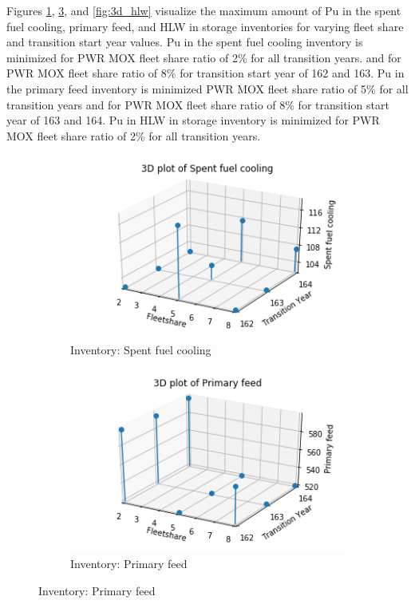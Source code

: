 Figures \ref{fig:3d_sfc}, \ref{fig:3d_pf}, and \ref{fig:3d_hlw}
visualize the maximum amount of Pu in the spent fuel cooling, 
primary feed, and \gls{HLW} in storage inventories for varying 
fleet share and transition start year values. 
Pu in the spent fuel cooling inventory is minimized for PWR MOX
fleet share ratio of 2\% for all transition years. 
and for PWR MOX fleet share ratio of 8\% for 
transition start year of 162 and 163.  
Pu in the primary feed inventory is minimized PWR MOX
fleet share ratio of 5\% for all transition years and for PWR MOX 
fleet share ratio of 8\% for 
transition start year of 163 and 164.                       
Pu in HLW in storage inventory is minimized for PWR MOX
fleet share ratio of 2\% for all transition years. 

\begin{figure}[H]
    \centering
    \begin{subfigure}[t]{\textwidth}
    \centering
        \includegraphics[width=0.4\linewidth]{figures/3d_sfc} 
        \caption{Inventory: Spent fuel cooling}
        \label{fig:3d_sfc}
    \end{subfigure}
    \begin{subfigure}[t]{0.4\textwidth}
        \centering
        \includegraphics[width=\linewidth]{figures/3d_pf} 
        \caption{Inventory: Primary feed}
	    \label{fig:3d_pf}

\end{subfigure}
\end{figure}
